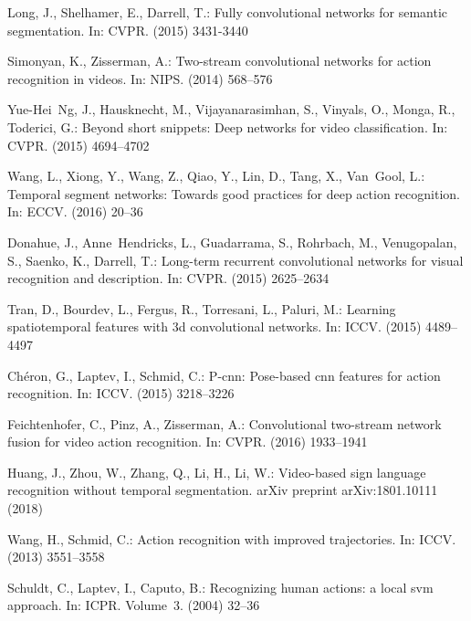 \documentclass[runningheads,a4paper]{llncs}
\begin{document}
\begin{thebibliography}{10}
	Long, J., Shelhamer, E., Darrell, T.:
	\newblock Fully convolutional networks for semantic segmentation.
	\newblock In: CVPR. (2015)  3431-3440

	Simonyan, K., Zisserman, A.:
	\newblock Two-stream convolutional networks for action recognition in videos.
	\newblock In: NIPS. (2014)  568--576

	Yue-Hei~Ng, J., Hausknecht, M., Vijayanarasimhan, S., Vinyals, O., Monga, R.,
	Toderici, G.:
	\newblock Beyond short snippets: Deep networks for video classification.
	\newblock In: CVPR. (2015)  4694--4702

	Wang, L., Xiong, Y., Wang, Z., Qiao, Y., Lin, D., Tang, X., Van~Gool, L.:
	\newblock Temporal segment networks: Towards good practices for deep action
	recognition.
	\newblock In: ECCV. (2016)  20--36

	Donahue, J., Anne~Hendricks, L., Guadarrama, S., Rohrbach, M., Venugopalan, S.,
	Saenko, K., Darrell, T.:
	\newblock Long-term recurrent convolutional networks for visual recognition and
	description.
	\newblock In: CVPR. (2015)  2625--2634

	Tran, D., Bourdev, L., Fergus, R., Torresani, L., Paluri, M.:
	\newblock Learning spatiotemporal features with 3d convolutional networks.
	\newblock In: ICCV. (2015)  4489--4497

	Ch{\'e}ron, G., Laptev, I., Schmid, C.:
	\newblock P-cnn: Pose-based cnn features for action recognition.
	\newblock In: ICCV. (2015)  3218--3226

	Feichtenhofer, C., Pinz, A., Zisserman, A.:
	\newblock Convolutional two-stream network fusion for video action recognition.
	\newblock In: CVPR. (2016)  1933--1941

	Huang, J., Zhou, W., Zhang, Q., Li, H., Li, W.:
	\newblock Video-based sign language recognition without temporal segmentation.
	\newblock arXiv preprint arXiv:1801.10111 (2018)

	Wang, H., Schmid, C.:
	\newblock Action recognition with improved trajectories.
	\newblock In: ICCV. (2013)  3551--3558

	Schuldt, C., Laptev, I., Caputo, B.:
	\newblock Recognizing human actions: a local svm approach.
	\newblock In: ICPR. Volume~3. (2004)  32--36


\end{thebibliography}
\end{document}
